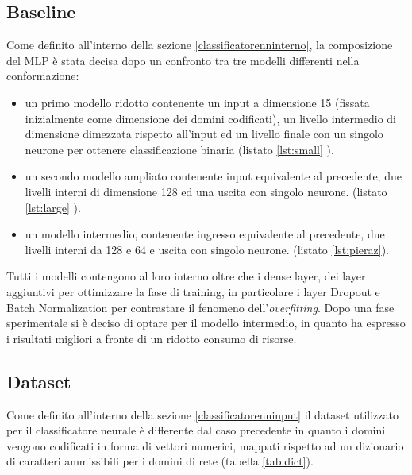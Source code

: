 \subsection{Baseline}
Come definito all'interno della sezione \ref{classificatorenninterno}, la composizione del MLP è stata decisa dopo un confronto tra tre modelli differenti nella conformazione: 

\begin{itemize}
\item un primo modello ridotto contenente un input a dimensione 15 (fissata inizialmente come dimensione dei domini codificati), un livello intermedio di dimensione dimezzata rispetto all'input ed un livello finale con un singolo neurone per ottenere classificazione binaria (listato \ref{lst:small} ). 





\item un secondo modello ampliato contenente input equivalente al precedente, due livelli interni di dimensione 128 ed una uscita con singolo neurone. (listato \ref{lst:large} ).





\item un modello intermedio, contenente ingresso equivalente al precedente, due livelli interni da 128 e 64 e uscita con singolo neurone. (listato \ref{lst:pieraz}).




\end{itemize}

Tutti i modelli contengono al loro interno oltre che i dense layer, dei layer aggiuntivi per ottimizzare la fase di training, in particolare i layer Dropout e Batch Normalization per contrastare il fenomeno dell'\textit{overfitting}. Dopo una fase sperimentale si è deciso di optare per il modello intermedio, in quanto ha espresso i risultati migliori a fronte di un ridotto consumo di risorse.

\subsection{Dataset}
Come definito all'interno della sezione \ref{classificatorenninput} il dataset utilizzato per il classificatore neurale è differente dal caso precedente in quanto i domini vengono codificati in forma di vettori numerici, mappati rispetto ad un dizionario di caratteri ammissibili per i domini di rete (tabella \ref{tab:dict}).


